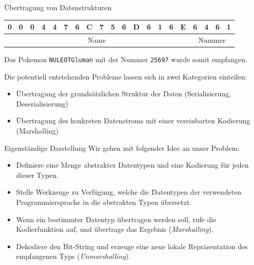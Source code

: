 \begin{example}{Übertragung von Datenstrukturen}
    \begin{center}
        \begin{tabular}{|c|c|c|c|c|c|c|c|c|c|c|c|c|c|c|c|c|c|c|c|}
            \hline
            0                          & 0                            & 0 & 4 & 4 & 7 & 6 & C & 7 & 5 & 6 & D & 6 & 1 & 6 & E & 6 & 4 & 6 & 1 \\\hline
            \multicolumn{16}{|c}{Name} & \multicolumn{4}{|c|}{Nummer}                                                                         \\\hline
        \end{tabular}
    \end{center}
    
    Das Pokemon \texttt{NULEOTGluman} mit der Nummer \texttt{25697} wurde somit empfangen.
    
    Die potentiell entstehenden Probleme lassen sich in zwei Kategorien einteilen:
    
    \begin{itemize}
        \item Übertragung der grundsätzlichen Struktur der Daten (Serialisierung, Deserialisierung)
        \item Übertragung des konkreten Datenstroms mit einer vereinbarten Kodierung (Marshalling)
    \end{itemize}
\end{example}

\begin{bonus}{Eigenständige Darstellung}
    Wir gehen mit folgender Idee an unser Problem:
    
    \begin{itemize}
        \item Definiere eine Menge abstrakter Datentypen und eine Kodierung für jeden dieser Typen.
        \item Stelle Werkzeuge zu Verfügung, welche die Datentypen der verwendeten Programmiersprache in die abstrakten Typen übersetzt.
        \item Wenn ein bestimmter Datentyp übertragen werden soll, rufe die Kodierfunktion auf, und übertrage das Ergebnis (\emph{Marshalling}).
        \item Dekodiere den Bit-String und erzeuge eine neue lokale Repräsentation des empfangenen Typs (\emph{Unmarshalling}).
    \end{itemize}
\end{bonus}

